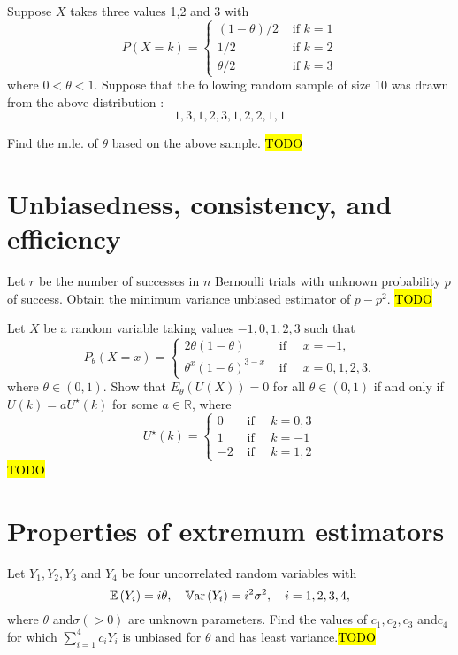 \begin{example}
\label{exa:isi2007samplepsb10}Suppose $X$ takes three values 1,2
and 3 with 
\[
P(X=k)=\begin{cases}
(1-\theta)/2 & \text{ if }k=1\\
1/2 & \text{ if }k=2\\
\theta/2 & \text{ if }k=3
\end{cases}
\]
 where $0<\theta<1$. Suppose that the following random sample of
size 10 was drawn from the above distribution : 
\[
1,3,1,2,3,1,2,2,1,1
\]

Find the m.le. of $\theta$ based on the above sample. \hl{TODO}
\end{example}


\section{Unbiasedness, consistency, and efficiency}
\begin{example}
\label{exa:isi2008samplepsb11} Let $r$ be the number of successes
in $n$ Bernoulli trials with unknown probability $p$ of success.
Obtain the minimum variance unbiased estimator of $p-p^{2}$.
\hl{TODO}
\end{example}

\begin{example}
	\label{exa:isi2009samplepsb7}
	Let $X$ be a random variable taking values $-1,0,1,2,3$ such that
	$$
	P_\theta(X=x)= \begin{cases}2 \theta(1-\theta) & \text { if } \quad x=-1, \\ \theta^x(1-\theta)^{3-x} & \text { if } \quad x=0,1,2,3 .\end{cases}
	$$
	where $\theta \in(0,1)$. Show that $E_\theta(U(X))=0$ for all $\theta \in(0,1)$ if and only if $U(k)=a U^{\star}(k)$ for some $a \in \mathbb{R}$, where
	$$
	U^{\star}(k)=\left\{\begin{array}{ccc}
		0 & \text { if } \quad k=0,3 \\
		1 & \text { if } \quad k=-1 \\
		-2 & \text { if } \quad k=1,2
	\end{array}\right.
	$$
	\hl{TODO}
\end{example}


\section{Properties of extremum estimators}
\begin{example}
\label{exa:isi2004samplepsb6}Let $Y_{1},Y_{2},Y_{3}$ and $Y_{4}$
be four uncorrelated random variables with 
\[
\mathbb{E}\left(Y_{i}\right)=i\theta,\quad\mathbb{V\mathrm{ar}}\left(Y_{i}\right)=i^{2}\sigma^{2},\quad i=1,2,3,4,
\]
 where $\theta$ and$\sigma(>0)$ are unknown parameters. Find the
values of $c_{1},c_{2},c_{3}$ and$c_{4}$ for which $\sum_{i=1}^{4}c_{i}Y_{i}$
is unbiased for $\theta$ and has least variance.\hl{TODO}
\end{example}

